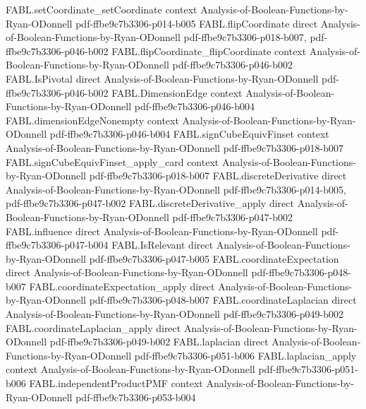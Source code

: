 \begin{theorem}
\proofstep
  {FABL.setCoordinate_setCoordinate}
  {context}
  {Analysis-of-Boolean-Functions-by-Ryan-ODonnell}
  {pdf-ffbe9c7b3306-p014-b005}
\proofstep
  {FABL.flipCoordinate}
  {direct}
  {Analysis-of-Boolean-Functions-by-Ryan-ODonnell}
  {pdf-ffbe9c7b3306-p018-b007,
    pdf-ffbe9c7b3306-p046-b002}
\proofstep
  {FABL.flipCoordinate_flipCoordinate}
  {context}
  {Analysis-of-Boolean-Functions-by-Ryan-ODonnell}
  {pdf-ffbe9c7b3306-p046-b002}
\proofstep
  {FABL.IsPivotal}
  {direct}
  {Analysis-of-Boolean-Functions-by-Ryan-ODonnell}
  {pdf-ffbe9c7b3306-p046-b002}
\proofstep
  {FABL.DimensionEdge}
  {context}
  {Analysis-of-Boolean-Functions-by-Ryan-ODonnell}
  {pdf-ffbe9c7b3306-p046-b004}
\proofstep
  {FABL.dimensionEdgeNonempty}
  {context}
  {Analysis-of-Boolean-Functions-by-Ryan-ODonnell}
  {pdf-ffbe9c7b3306-p046-b004}
\proofstep
  {FABL.signCubeEquivFinset}
  {context}
  {Analysis-of-Boolean-Functions-by-Ryan-ODonnell}
  {pdf-ffbe9c7b3306-p018-b007}
\proofstep
  {FABL.signCubeEquivFinset_apply_card}
  {context}
  {Analysis-of-Boolean-Functions-by-Ryan-ODonnell}
  {pdf-ffbe9c7b3306-p018-b007}
\proofstep
  {FABL.discreteDerivative}
  {direct}
  {Analysis-of-Boolean-Functions-by-Ryan-ODonnell}
  {pdf-ffbe9c7b3306-p014-b005,
    pdf-ffbe9c7b3306-p047-b002}
\proofstep
  {FABL.discreteDerivative_apply}
  {direct}
  {Analysis-of-Boolean-Functions-by-Ryan-ODonnell}
  {pdf-ffbe9c7b3306-p047-b002}
\proofstep
  {FABL.influence}
  {direct}
  {Analysis-of-Boolean-Functions-by-Ryan-ODonnell}
  {pdf-ffbe9c7b3306-p047-b004}
\proofstep
  {FABL.IsRelevant}
  {direct}
  {Analysis-of-Boolean-Functions-by-Ryan-ODonnell}
  {pdf-ffbe9c7b3306-p047-b005}
\proofstep
  {FABL.coordinateExpectation}
  {direct}
  {Analysis-of-Boolean-Functions-by-Ryan-ODonnell}
  {pdf-ffbe9c7b3306-p048-b007}
\proofstep
  {FABL.coordinateExpectation_apply}
  {direct}
  {Analysis-of-Boolean-Functions-by-Ryan-ODonnell}
  {pdf-ffbe9c7b3306-p048-b007}
\proofstep
  {FABL.coordinateLaplacian}
  {direct}
  {Analysis-of-Boolean-Functions-by-Ryan-ODonnell}
  {pdf-ffbe9c7b3306-p049-b002}
\proofstep
  {FABL.coordinateLaplacian_apply}
  {direct}
  {Analysis-of-Boolean-Functions-by-Ryan-ODonnell}
  {pdf-ffbe9c7b3306-p049-b002}
\proofstep
  {FABL.laplacian}
  {direct}
  {Analysis-of-Boolean-Functions-by-Ryan-ODonnell}
  {pdf-ffbe9c7b3306-p051-b006}
\proofstep
  {FABL.laplacian_apply}
  {context}
  {Analysis-of-Boolean-Functions-by-Ryan-ODonnell}
  {pdf-ffbe9c7b3306-p051-b006}
\proofstep
  {FABL.independentProductPMF}
  {context}
  {Analysis-of-Boolean-Functions-by-Ryan-ODonnell}
  {pdf-ffbe9c7b3306-p053-b004}
\proofstep

\end{theorem}
